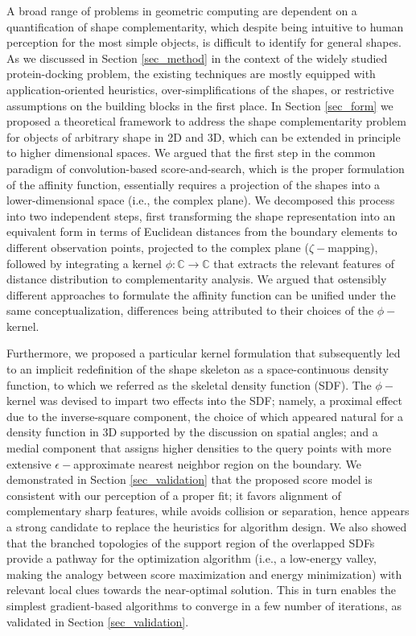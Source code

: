 \documentclass[article]{gmp2014}
\theoremstyle{definition}
\begin{document}
A broad range of problems in geometric computing are dependent on a quantification of shape complementarity, which despite being intuitive to human perception for the most simple objects, is difficult to identify for general shapes. As we discussed in Section \ref{sec_method} in the context of the widely studied protein-docking problem, the existing techniques are mostly equipped with application-oriented heuristics, over-simplifications of the shapes, or restrictive assumptions on the building blocks in the first place. In Section \ref{sec_form} we proposed a theoretical framework to address the shape complementarity problem for objects of arbitrary shape in 2D and 3D, which can be extended in principle to higher dimensional spaces.
We argued that the first step in the common paradigm of convolution-based score-and-search, which is the proper formulation of the affinity function, essentially requires a projection of the shapes into a lower-dimensional space (i.e., the complex plane). We decomposed this process into two independent steps, first transforming the shape representation into an equivalent form in terms of Euclidean distances from the boundary elements to different observation points, projected to the complex plane ($\zeta-$mapping), followed by integrating a kernel $\phi: \mathds{C} \rightarrow \mathds{C}$ that extracts the relevant features of distance distribution to complementarity analysis. We argued that ostensibly different approaches to formulate the affinity function can be unified under the same conceptualization, differences being attributed to their choices of the $\phi-$kernel.

Furthermore, we proposed a particular kernel formulation that subsequently led to an implicit redefinition of the shape skeleton as a space-continuous density function, to which we referred as the skeletal density function (SDF). The $\phi-$kernel was devised to impart two effects into the SDF; namely, a proximal effect due to the inverse-square component, the choice of which appeared natural for a density function in 3D supported by the discussion on spatial angles; and a medial component that assigns higher densities to the query points with more extensive $\epsilon-$approximate nearest neighbor region on the boundary. We demonstrated in Section \ref{sec_validation} that the proposed score model is consistent with our perception of a proper fit; it favors alignment of complementary sharp features, while avoids collision or separation, hence appears a strong candidate to replace the heuristics for algorithm design. We also showed that the branched topologies of the support region of the overlapped SDFs provide a pathway for the optimization algorithm (i.e., a low-energy valley, making the analogy between score maximization and energy minimization) with relevant local clues towards the near-optimal solution. This in turn enables the simplest gradient-based algorithms to converge in a few number of iterations, as validated in Section \ref{sec_validation}.
\end{document}
